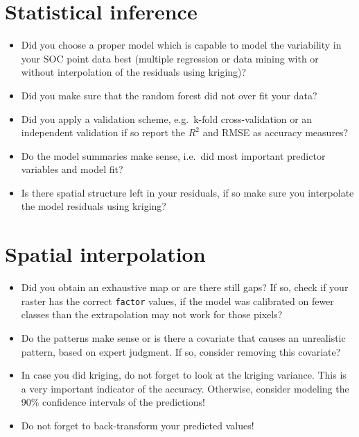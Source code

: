 \documentclass[10pt,b5paper,]{book}
\providecommand{\tightlist}{%
  \setlength{\itemsep}{0pt}\setlength{\parskip}{0pt}}
\theoremstyle{definition}
\theoremstyle{definition}
\theoremstyle{definition}
\theoremstyle{remark}
\begin{document}
\hypertarget{statistical-inference}{%
\section{Statistical inference}\label{statistical-inference}}

\begin{itemize}
\tightlist
\item
  Did you choose a proper model which is capable to model the
  variability in your SOC point data best (multiple regression or data
  mining with or without interpolation of the residuals using kriging)?
\item
  Did you make sure that the random forest did not over fit your data?
\item
  Did you apply a validation scheme, e.g.~k-fold cross-validation or an
  independent validation if so report the \(R^2\) and RMSE as accuracy
  measures?
\item
  Do the model summaries make sense, i.e.~did most important predictor
  variables and model fit?
\item
  Is there spatial structure left in your residuals, if so make sure you
  interpolate the model residuals using kriging?
\end{itemize}

\hypertarget{spatial-interpolation}{%
\section{Spatial interpolation}\label{spatial-interpolation}}

\begin{itemize}
\tightlist
\item
  Did you obtain an exhaustive map or are there still gaps? If so, check
  if your raster has the correct \texttt{factor} values, if the model
  was calibrated on fewer classes than the extrapolation may not work
  for those pixels?
\item
  Do the patterns make sense or is there a covariate that causes an
  unrealistic pattern, based on expert judgment. If so, consider
  removing this covariate?
\item
  In case you did kriging, do not forget to look at the kriging
  variance. This is a very important indicator of the accuracy.
  Otherwise, consider modeling the 90\% confidence intervals of the
  predictions!
\item
  Do not forget to back-transform your predicted values!
\end{itemize}
\end{document}
